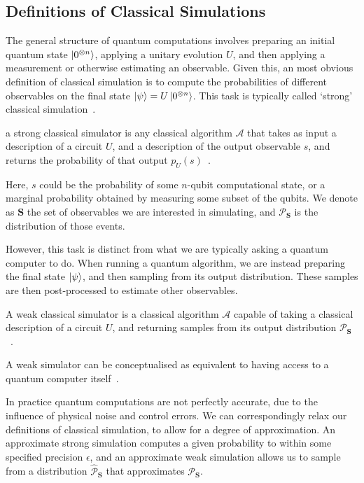 \subsection{Definitions of Classical Simulations}\label{sec:intro_simulation_types}
The general structure of quantum computations involves preparing an initial quantum state $\ket{0^{\otimes n}}$, applying a unitary evolution $U$, and then applying a measurement or otherwise estimating an observable. Given this, an most obvious definition of classical simulation is to compute the probabilities of different observables on the final state $\ket{\psi}=U\ket{0^{\otimes n}}$. This task is typically called `strong' classical simulation~\cite{VandenNest2008}.
\begin{defn}\label{def:strong_simulation}
a strong classical simulator is any classical algorithm $\mathcal{A}$ that takes as input a description of a circuit $U$, and a description of the output observable $s$, and returns the probability of that output $p_{U}\left(s\right)$~\cite{VandenNest2008}.
\end{defn}
Here, $s$ could be the probability of some $n$-qubit computational state, or a marginal probability obtained by measuring some subset of the qubits. We denote as $\mathbf{S}$ the set of observables we are interested in simulating, and $\mathcal{P}_{\mathbf{S}}$ is the distribution of those events.\par
However, this task is distinct from what we are typically asking a quantum computer to do. When running a quantum algorithm, we are instead preparing the final state $\ket{\psi}$, and then sampling from its output distribution. These samples are then post-processed to estimate other observables.
\begin{defn}\label{def:weak_simulation}
A weak classical simulator is a classical algorithm $\mathcal{A}$ capable of taking a classical description of a circuit $U$, and returning samples from its output distribution $\mathcal{P}_{\mathbf{S}}$~\cite{VandenNest2008}.
\end{defn}
A weak simulator can be conceptualised as equivalent to having access to a quantum computer itself~\cite{Pashayan2017}.\par
In practice quantum computations are not perfectly accurate, due to the influence of physical noise and control errors. We can correspondingly relax our definitions of classical simulation, to allow for a degree of approximation. An approximate strong simulation computes a given probability to within some specified precision $\epsilon$, and an approximate weak simulation allows us to sample from a distribution $\mathcal{\hat{P}}_{\mathbf{S}}$ that approximates $\mathcal{P}_{\mathbf{S}}$.\par
